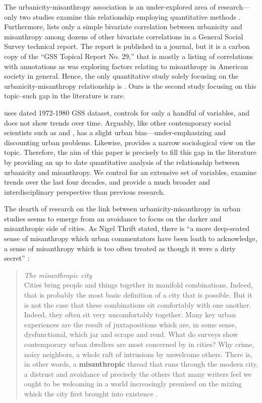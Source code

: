 \documentclass[11pt, letterpaper]{article}
\begin{document}
\begin{spacing}{1.4}
The urbanicity-misanthropy association is an under-explored area of research---only two studies examine this relationship employing quantitative methods \citep{wilson85,smith97}. Furthermore, \citet{smith97} lists only a simple bivariate correlation between urbanicity and misanthropy among dozens of other bivariate correlations in a General Social Survey technical report. The report is published in a journal, but it is a carbon copy of the ``GSS Topical Report No. 29,'' that is mostly a listing of correlations with annotations as \citet{smith97} was exploring factors relating to misanthropy in American society in general.
Hence, the only quantitative study solely focusing on the urbanicity-misanthropy
relationship is \citet{wilson85}. Ours is the second study focusing on this topic--such gap in the literature is rare.

\citet{wilson85} uses dated 1972-1980 GSS dataset, controls for only a
handful of variables, and does not show trends over time.  Arguably, like other contemporary social scientists such as \citet[e.g.,][]{veenhoven94,meyer13} and \citet[e.g.,][]{fischer82}, \citeauthor{wilson85} has a slight urban bias---under-emphasizing and discounting urban problems. Likewise, \citet{wilson85} provides a narrow sociological view on the topic. Therefore, the aim of this paper is precisely to fill this gap in the literature by providing an up to date quantitative analysis of the relationship between urbanicity and misanthropy. We control  for an extensive set of variables, examine trends over the last four decades, and provide a much broader and interdisciplinary perspective than previous research. 

The dearth of research on the link between urbanicity-misanthropy in urban studies seems to emerge from an avoidance to focus on the darker and misanthropic side of cities. As Nigel Thrift stated, there is ``a more deep-seated sense of misanthropy which urban commentators have been loath to acknowledge, a sense of misanthropy which is too often treated as though it were a dirty secret'' \citep[p. 134]{thrift05}: 
\begin{quote}
  \textit{The misanthropic city}\\
  Cities bring people and things together in manifold combinations. Indeed, that is probably the most basic
definition of a city that is possible. But it is not the case that these combinations sit comfortably with one
another. Indeed, they often sit very uncomfortably together. Many key urban experiences are the result of
juxtapositions which are, in some sense, dysfunctional, which jar and scrape and rend. What do surveys
show contemporary urban dwellers are most concerned by in cities? Why crime, noisy neighbors, a whole
raft of intrusions by unwelcome others. There is, in other words, a \textbf{misanthropic} thread that runs through
the modern city, a distrust and avoidance of precisely the others that many writers feel we ought to be
welcoming in a world increasingly premised on the mixing which the city first brought into existence \citep[p. 140 (``misanthropic'' bolded by us]{thrift05}.
\end{quote}


\end{spacing}
\end{document}
